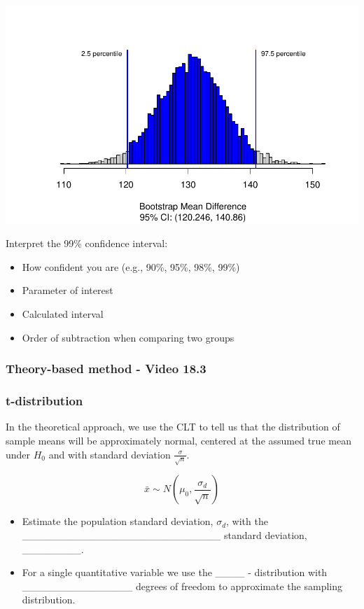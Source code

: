 \documentclass[
]{report}
\begin{document}
\begin{center}\includegraphics[width=0.7\linewidth]{11-VN11-paired_files/figure-latex/unnamed-chunk-6-1} \end{center}

\newpage

Interpret the 99\% confidence interval:

\begin{itemize}
\item
  How confident you are (e.g., 90\%, 95\%, 98\%, 99\%)
\item
  Parameter of interest
\item
  Calculated interval
\item
  Order of subtraction when comparing two groups
\end{itemize}

\vspace{0.8in}

\subsubsection*{Theory-based method - Video 18.3}\label{theory-based-method---video-18.3}

\subsubsection*{t-distribution}\label{t-distribution-2}

In the theoretical approach, we use the CLT to tell us that the distribution of sample means will be approximately normal, centered at the assumed true mean under \(H_0\) and with standard deviation \(\frac{\sigma}{\sqrt{n}}\).

\[\bar{x} \sim N(\mu_0, \frac{\sigma_d}{\sqrt{n}})\]

\begin{itemize}
\item
  Estimate the population standard deviation, \(\sigma_d\), with the
  \_\_\_\_\_\_\_\_\_\_\_\_\_\_\_\_\_\_\_\_\_\_\_\_\_\_\_ standard deviation, \_\_\_\_\_\_\_\_.
\item
  For a single quantitative variable we use the \_\_\_\_ - distribution
  with \_\_\_\_\_\_\_\_\_\_\_\_\_\_\_
  degrees of freedom to approximate the sampling distribution.
\end{itemize}
\end{document}

